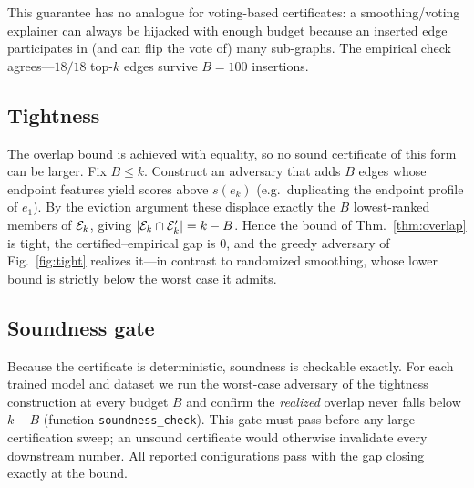 This guarantee has no analogue for voting-based certificates: a smoothing/voting
explainer can always be hijacked with enough budget because an inserted edge
participates in (and can flip the vote of) many sub-graphs. The empirical check
agrees---$18/18$ top-$k$ edges survive $B=100$ insertions.

\subsection*{Tightness}
The overlap bound is achieved with equality, so no sound certificate of this
form can be larger. Fix $B\le k$. Construct an adversary that adds $B$ edges
whose endpoint features yield scores above $s(e_k)$ (e.g.\ duplicating the
endpoint profile of $e_1$). By the eviction argument these displace exactly the
$B$ lowest-ranked members of $\mathcal{E}_k$, giving $|\mathcal{E}_k\cap\mathcal{E}_k'|=k-B$. Hence the bound
of Thm.~\ref{thm:overlap} is tight, the certified--empirical gap is $0$, and the
greedy adversary of Fig.~\ref{fig:tight} realizes it---in contrast to randomized
smoothing, whose lower bound is strictly below the worst case it admits.

\subsection*{Soundness gate}
Because the certificate is deterministic, soundness is checkable exactly. For
each trained model and dataset we run the worst-case adversary of the tightness
construction at every budget $B$ and confirm the \emph{realized} overlap never
falls below $k-B$ (function \texttt{soundness\_check}). This gate must pass
before any large certification sweep; an unsound certificate would otherwise
invalidate every downstream number. All reported configurations pass with the
gap closing exactly at the bound.
